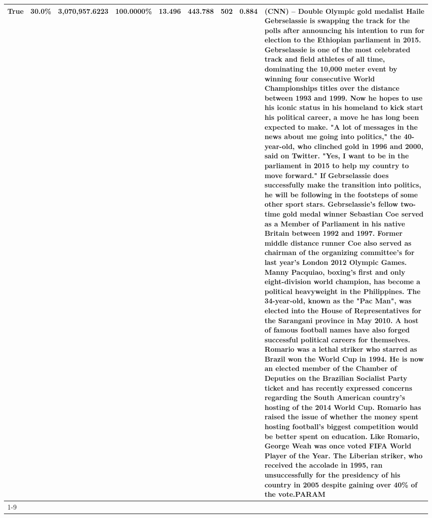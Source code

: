 \begin{table}[H]
{\begin{tabular}{lllrlllll}
True & 30.0\% & 3,070,957.6223 & \bfseries \color{red} 100.0000\% & 13.496 & 443.788 & 502 & 0.884 & (CNN) -- Double Olympic gold medalist Haile Gebrselassie is swapping the track for the polls after announcing his intention to run for election to the Ethiopian parliament in 2015. Gebrselassie is one of the most celebrated track and field athletes of all time, dominating the 10,000 meter event by winning four consecutive World Championships titles over the distance between 1993 and 1999. Now he hopes to use his iconic status in his homeland to kick start his political career, a move he has long been expected to make. "A lot of messages in the news about me going into politics," the 40-year-old, who clinched gold in 1996 and 2000, said on Twitter. "Yes, I want to be in the parliament in 2015 to help my country to move forward." If Gebrselassie does successfully make the transition into politics, he will be following in the footsteps of some other sport stars. Gebrselassie's fellow two-time gold medal winner Sebastian Coe served as a Member of Parliament in his native Britain between 1992 and 1997. Former middle distance runner Coe also served as chairman of the organizing committee's for last year's London 2012 Olympic Games. Manny Pacquiao, boxing's first and only eight-division world champion, has become a political heavyweight in the Philippines. The 34-year-old, known as the "Pac Man", was elected into the House of Representatives for the Sarangani province in May 2010. A host of famous football names have also forged successful political careers for themselves. Romario was a lethal striker who starred as Brazil won the World Cup in 1994. He is now an elected member of the Chamber of Deputies on the Brazilian Socialist Party ticket and has recently expressed concerns regarding the South American country's hosting of the 2014 World Cup. Romario has raised the issue of whether the money spent hosting football's biggest competition would be better spent on education. Like Romario, George Weah was once voted FIFA World Player of the Year. The Liberian striker, who received the accolade in 1995, ran unsuccessfully for the presidency of his country in 2005 despite gaining over 40\% of the vote.PARAM \\
\cline{1-9}

\end{tabular}}
\end{table}
